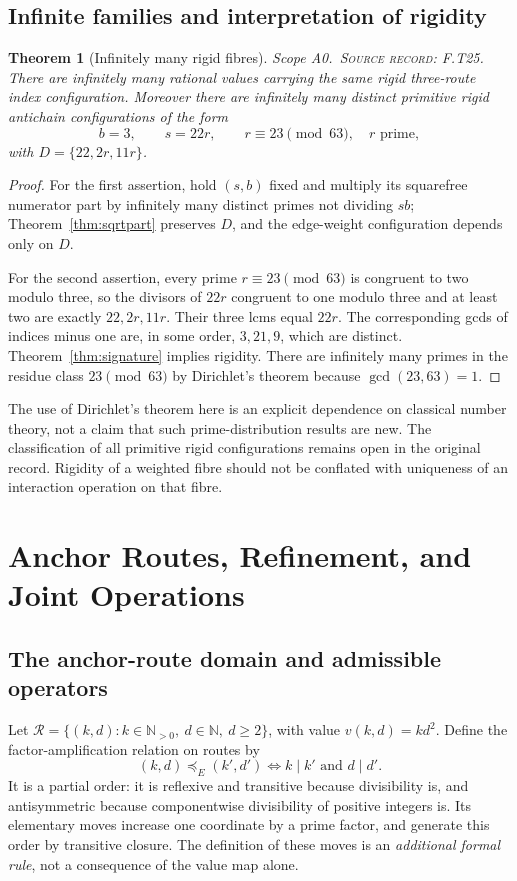\documentclass[11pt,oneside,openany]{book}
\newtheorem{theorem}{Theorem}[chapter]
\theoremstyle{definition}
\theoremstyle{remark}
\newcommand{\N}{\mathbb{N}}
\newcommand{\gcdop}{\operatorname{gcd}}
\newcommand{\scope}[1]{\textsf{\small Scope #1.}\ }
\newcommand{\record}[1]{\textup{\textsc{Source record: #1.}}\ }
\newcommand{\Rh}{\mathcal{R}}
\begin{document}
\section{Infinite families and interpretation of rigidity}
\begin{theorem}[Infinitely many rigid fibres]\label{thm:infinite}
\scope{A0}\record{F.T25} There are infinitely many rational values carrying the same rigid three-route index configuration. Moreover there are infinitely many distinct primitive rigid antichain configurations of the form
\[
 b=3,\qquad s=22r,\qquad r\equiv23\pmod{63},\quad r\text{ prime},
\]
with \(D=\{22,2r,11r\}\).
\end{theorem}
\begin{proof}
For the first assertion, hold \((s,b)\) fixed and multiply its squarefree numerator part by infinitely many distinct primes not dividing \(sb\); Theorem~\ref{thm:sqrtpart} preserves \(D\), and the edge-weight configuration depends only on \(D\).

For the second assertion, every prime \(r\equiv23\pmod{63}\) is congruent to two modulo three, so the divisors of \(22r\) congruent to one modulo three and at least two are exactly \(22,2r,11r\). Their three lcms equal \(22r\). The corresponding gcds of indices minus one are, in some order, \(3,21,9\), which are distinct. Theorem~\ref{thm:signature} implies rigidity. There are infinitely many primes in the residue class \(23\pmod{63}\) by Dirichlet's theorem because \(\gcdop(23,63)=1\).
\end{proof}

The use of Dirichlet's theorem here is an explicit dependence on classical number theory, not a claim that such prime-distribution results are new. The classification of all primitive rigid configurations remains open in the original record. Rigidity of a weighted fibre should not be conflated with uniqueness of an interaction operation on that fibre.

\chapter{Anchor Routes, Refinement, and Joint Operations}\label{ch:selection}
\section{The anchor-route domain and admissible operators}
Let \(\Rh=\{(k,d):k\in\N_{>0},\ d\in\N,\ d\ge2\}\), with value \(v(k,d)=kd^2\). Define the factor-amplification relation on routes by
\[
 (k,d)\preceq_E(k',d')\iff k\mid k'\text{ and }d\mid d'.
\]
It is a partial order: it is reflexive and transitive because divisibility is, and antisymmetric because componentwise divisibility of positive integers is. Its elementary moves increase one coordinate by a prime factor, and generate this order by transitive closure. The definition of these moves is an \emph{additional formal rule}, not a consequence of the value map alone.
\end{document}
